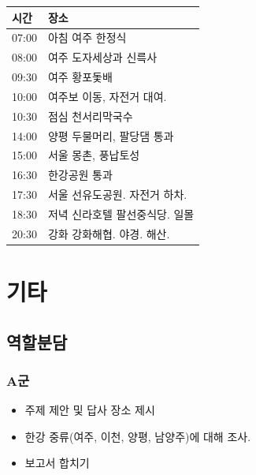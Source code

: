 \documentclass[chapter, oneside]{oblivoir}
\begin{document}
\begin{table}[ht]
    \begin{center}
    \begin{tabular}{rl}
    \multicolumn{1}{l}{시간}     & \multicolumn{1}{l}{장소} \\ \hline
    \multicolumn{1}{r|}{07:00} & 아침   여주 한정식         \\
    \multicolumn{1}{r|}{08:00} & 여주   도자세상과 신륵사      \\
    \multicolumn{1}{r|}{09:30} & 여주   황포돛배           \\
    \multicolumn{1}{r|}{10:00} & 여주보 이동, 자전거 대여.     \\
    \multicolumn{1}{r|}{10:30} & 점심   천서리막국수         \\
    \multicolumn{1}{r|}{14:00} & 양평 두물머리, 팔당댐 통과     \\
    \multicolumn{1}{r|}{15:00} & 서울 몽촌, 풍납토성         \\
    \multicolumn{1}{r|}{16:30} & 한강공원   통과           \\
    \multicolumn{1}{r|}{17:30} & 서울   선유도공원. 자전거 하차. \\
    \multicolumn{1}{r|}{18:30} & 저녁   신라호텔 팔선중식당. 일몰 \\
    \multicolumn{1}{r|}{20:30} & 강화   강화해협. 야경. 해산. 
    \end{tabular}   
    \end{center}
\end{table}






\chapter{기타}
\section{역할분담}
\subsection{A군}
\begin{itemize}
    \item 주제 제안 및 답사 장소 제시
    \item 한강 중류(여주, 이천, 양평, 남양주)에 대해 조사.
    \item {} 보고서 합치기
\end{itemize}
\end{document}
